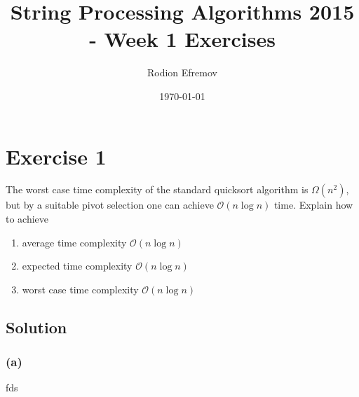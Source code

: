\documentclass[10pt]{article}
\title{String Processing Algorithms 2015 - Week 1 Exercises}
\author{Rodion Efremov}
\date{\today}
\begin{document}
\maketitle

\section*{Exercise 1}
\color{blue} The worst case time complexity of the standard quicksort algorithm is $\Omega(n^2)$, but by a suitable pivot selection one can achieve $\mathcal{O}(n \log n)$ time. Explain how to achieve
\begin{enumerate}[label=(\alph*)]
\item average time complexity $\mathcal{O}(n \log n)$
\item expected time complexity $\mathcal{O}(n \log n)$
\item worst case time complexity $\mathcal{O}(n \log n)$
\end{enumerate}
\color{black}

\subsection*{Solution}
\subsubsection*{(a)}fds
\end{document}
